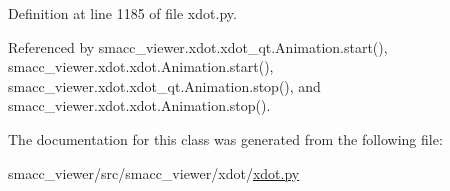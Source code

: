Definition at line 1185 of file xdot.\+py.



Referenced by smacc\+\_\+viewer.\+xdot.\+xdot\+\_\+qt.\+Animation.\+start(), smacc\+\_\+viewer.\+xdot.\+xdot.\+Animation.\+start(), smacc\+\_\+viewer.\+xdot.\+xdot\+\_\+qt.\+Animation.\+stop(), and smacc\+\_\+viewer.\+xdot.\+xdot.\+Animation.\+stop().



The documentation for this class was generated from the following file\+:\begin{DoxyCompactItemize}
\item 
smacc\+\_\+viewer/src/smacc\+\_\+viewer/xdot/\hyperlink{xdot_8py}{xdot.\+py}\end{DoxyCompactItemize}
